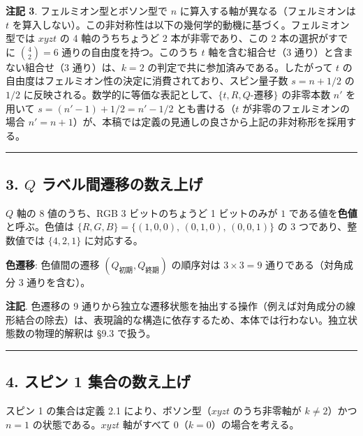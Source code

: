 \documentclass[
  a4paper,11pt]{ltjsarticle}
\theoremstyle{definition}
\theoremstyle{remark}
\begin{document}
\textbf{注記 3}. フェルミオン型とボソン型で \(n\)
に算入する軸が異なる（フェルミオンは \(t\)
を算入しない）。この非対称性は以下の幾何学的動機に基づく。フェルミオン型では
\(xyzt\) の 4 軸のうちちょうど 2 本が非零であり、この 2 本の選択がすでに
\(\binom{4}{2} = 6\) 通りの自由度を持つ。このうち \(t\)
軸を含む組合せ（3 通り）と含まない組合せ（3 通り）は、\(k = 2\)
の判定で共に参加済みである。したがって \(t\)
の自由度はフェルミオン性の決定に消費されており、スピン量子数
\(s = n + 1/2\) の \(1/2\)
に反映される。数学的に等価な表記として、\(\{t, R, Q\text{-遷移}\}\)
の非零本数 \(n'\) を用いて \(s = (n' - 1) + 1/2 = n' - 1/2\)
とも書ける（\(t\) が非零のフェルミオンの場合
\(n' = n + 1\)）が、本稿では定義の見通しの良さから上記の非対称形を採用する。

\begin{center}\rule{0.5\linewidth}{0.5pt}\end{center}

\subsection{\texorpdfstring{3. \(Q\)
ラベル間遷移の数え上げ}{3. Q ラベル間遷移の数え上げ}}\label{q-ux30e9ux30d9ux30ebux9593ux9077ux79fbux306eux6570ux3048ux4e0aux3052}

\(Q\) 軸の 8 値のうち、RGB 3 ビットのちょうど 1 ビットのみが \(1\)
である値を\textbf{色値}と呼ぶ。色値は
\(\{R, G, B\} = \{(1,0,0),\, (0,1,0),\, (0,0,1)\}\) の 3
つであり、整数値では \(\{4, 2, 1\}\) に対応する。

\textbf{色遷移}: 色値間の遷移 \((Q_\text{初期}, Q_\text{終期})\)
の順序対は \(3 \times 3 = 9\) 通りである（対角成分 3 通りを含む）。

\textbf{注記}. 色遷移の 9
通りから独立な遷移状態を抽出する操作（例えば対角成分の線形結合の除去）は、表現論的な構造に依存するため、本体では行わない。独立状態数の物理的解釈は
§9.3 で扱う。

\begin{center}\rule{0.5\linewidth}{0.5pt}\end{center}

\subsection{4. スピン 1
集合の数え上げ}\label{ux30b9ux30d4ux30f3-1-ux96c6ux5408ux306eux6570ux3048ux4e0aux3052}

スピン 1 の集合は定義 2.1 により、ボソン型（\(xyzt\) のうち非零軸が
\(k \neq 2\)）かつ \(n = 1\) の状態である。\(xyzt\) 軸がすべて
\(0\)（\(k = 0\)）の場合を考える。
\end{document}
